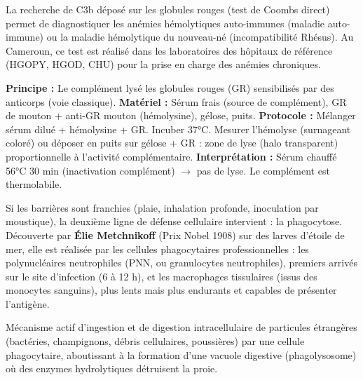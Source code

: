 \documentclass[11pt]{article}
\newcommand{\cle}[1]{{\popxbold\color{popdark}#1}}
\newcounter{popsec}
\newcounter{popsub}
\newcommand{\courssub}[1]{%
  \stepcounter{popsub}%
  \par\vspace{9pt}\noindent{\popxbold\fontsize{11.5}{13}\selectfont\color{popink}{\color{poporange}\thepopsec.\thepopsub}\hspace{6pt}#1}\par\nopagebreak\vspace{4pt}
}
\begin{document}
\begin{savaistu}
La recherche de C3b déposé sur les globules rouges (test de Coombs direct) permet de diagnostiquer les anémies hémolytiques auto-immunes (maladie auto-immune) ou la maladie hémolytique du nouveau-né (incompatibilité Rhésus). Au Cameroun, ce test est réalisé dans les laboratoires des hôpitaux de référence (HGOPY, HGOD, CHU) pour la prise en charge des anémies chroniques.

\begin{experience}
\textbf{Principe :} Le complément lysé les globules rouges (GR) sensibilisés par des anticorps (voie classique).
\textbf{Matériel :} Sérum frais (source de complément), GR de mouton + anti-GR mouton (hémolysine), gélose, puits.
\textbf{Protocole :} Mélanger sérum dilué + hémolysine + GR. Incuber 37°C. Mesurer l'hémolyse (surnageant coloré) ou déposer en puits sur gélose + GR : zone de lyse (halo transparent) proportionnelle à l'activité complémentaire.
\textbf{Interprétation :} Sérum chauffé 56°C 30 min (inactivation complément) $\rightarrow$ pas de lyse. Le complément est thermolabile.
\end{experience}
\end{savaistu}

\courssub{La phagocytose : le « manger » cellulaire}

Si les barrières sont franchies (plaie, inhalation profonde, inoculation par moustique), la deuxième ligne de défense cellulaire intervient : la \cle{phagocytose}. Découverte par \textbf{Élie Metchnikoff} (Prix Nobel 1908) sur des larves d'étoile de mer, elle est réalisée par les \cle{cellules phagocytaires professionnelles} : les \cle{polynucléaires neutrophiles} (PNN, ou granulocytes neutrophiles), premiers arrivés sur le site d'infection (6 à 12 h), et les \cle{macrophages} tissulaires (issus des monocytes sanguins), plus lents mais plus endurants et capables de présenter l'antigène.

\begin{definition}[Phagocytose]
Mécanisme actif d'ingestion et de digestion intracellulaire de particules étrangères (bactéries, champignons, débris cellulaires, poussières) par une cellule phagocytaire, aboutissant à la formation d'une vacuole digestive (\cle{phagolysosome}) où des enzymes hydrolytiques détruisent la proie.
\end{definition}
\end{document}
